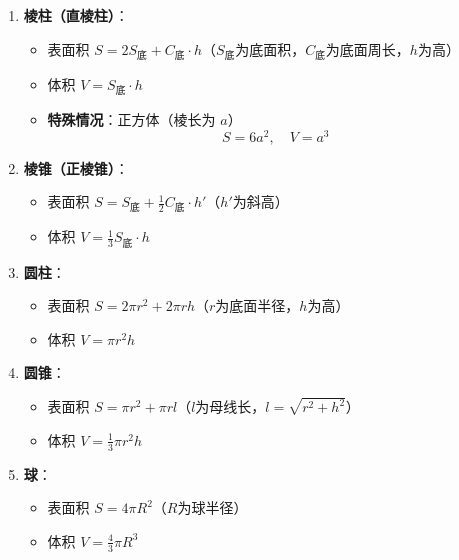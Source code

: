 \documentclass{article}
\begin{document}
\begin{enumerate}
    \item \textbf{棱柱（直棱柱）}：
          \begin{itemize}
              \item 表面积 \( S = 2S_{\text{底}} + C_{\text{底}} \cdot h \)（\( S_{\text{底}} \)为底面积，\( C_{\text{底}} \)为底面周长，\( h \)为高）
              \item 体积 \( V = S_{\text{底}} \cdot h \)
              \item \textbf{特殊情况}：正方体（棱长为 \( a \)）
                    \[
                    S = 6a^2, \quad V = a^3
                    \]
          \end{itemize}
          
    \item \textbf{棱锥（正棱锥）}：
          \begin{itemize}
              \item 表面积 \( S = S_{\text{底}} + \frac{1}{2}C_{\text{底}} \cdot h' \)（\( h' \)为斜高）
              \item 体积 \( V = \frac{1}{3}S_{\text{底}} \cdot h \)

          \end{itemize}
          
    \item \textbf{圆柱}：
          \begin{itemize}
              \item 表面积 \( S = 2\pi r^2 + 2\pi r h \)（\( r \)为底面半径，\( h \)为高）
              \item 体积 \( V = \pi r^2 h \)
          \end{itemize}
          
    \item \textbf{圆锥}：
          \begin{itemize}
              \item 表面积 \( S = \pi r^2 + \pi r l \)（\( l \)为母线长，\( l = \sqrt{r^2 + h^2} \)）
              \item 体积 \( V = \frac{1}{3}\pi r^2 h \)
          \end{itemize}
          
    \item \textbf{球}：
          \begin{itemize}
              \item 表面积 \( S = 4\pi R^2 \)（\( R \)为球半径）
              \item 体积 \( V = \frac{4}{3}\pi R^3 \)
          \end{itemize}
\end{enumerate}
\end{document}
